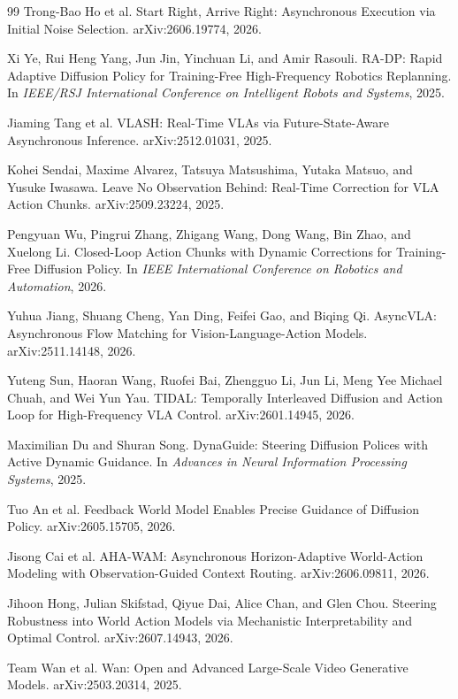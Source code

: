 \documentclass[10pt,twocolumn,letterpaper]{article}
\begin{document}
\begin{thebibliography}{99}
Trong-Bao Ho et al.
\newblock Start Right, Arrive Right: Asynchronous Execution via Initial Noise
Selection.
\newblock arXiv:2606.19774, 2026.

Xi Ye, Rui Heng Yang, Jun Jin, Yinchuan Li, and Amir Rasouli.
\newblock RA-DP: Rapid Adaptive Diffusion Policy for Training-Free High-Frequency
Robotics Replanning.
\newblock In \emph{IEEE/RSJ International Conference on Intelligent Robots and
Systems}, 2025.

Jiaming Tang et al.
\newblock VLASH: Real-Time VLAs via Future-State-Aware Asynchronous Inference.
\newblock arXiv:2512.01031, 2025.

Kohei Sendai, Maxime Alvarez, Tatsuya Matsushima, Yutaka Matsuo, and Yusuke
Iwasawa.
\newblock Leave No Observation Behind: Real-Time Correction for VLA Action
Chunks.
\newblock arXiv:2509.23224, 2025.

Pengyuan Wu, Pingrui Zhang, Zhigang Wang, Dong Wang, Bin Zhao, and Xuelong Li.
\newblock Closed-Loop Action Chunks with Dynamic Corrections for Training-Free
Diffusion Policy.
\newblock In \emph{IEEE International Conference on Robotics and Automation},
2026.

Yuhua Jiang, Shuang Cheng, Yan Ding, Feifei Gao, and Biqing Qi.
\newblock AsyncVLA: Asynchronous Flow Matching for Vision-Language-Action Models.
\newblock arXiv:2511.14148, 2026.

Yuteng Sun, Haoran Wang, Ruofei Bai, Zhengguo Li, Jun Li, Meng Yee Michael Chuah,
and Wei Yun Yau.
\newblock TIDAL: Temporally Interleaved Diffusion and Action Loop for
High-Frequency VLA Control.
\newblock arXiv:2601.14945, 2026.

Maximilian Du and Shuran Song.
\newblock DynaGuide: Steering Diffusion Polices with Active Dynamic Guidance.
\newblock In \emph{Advances in Neural Information Processing Systems}, 2025.

Tuo An et al.
\newblock Feedback World Model Enables Precise Guidance of Diffusion Policy.
\newblock arXiv:2605.15705, 2026.

Jisong Cai et al.
\newblock AHA-WAM: Asynchronous Horizon-Adaptive World-Action Modeling with
Observation-Guided Context Routing.
\newblock arXiv:2606.09811, 2026.

Jihoon Hong, Julian Skifstad, Qiyue Dai, Alice Chan, and Glen Chou.
\newblock Steering Robustness into World Action Models via Mechanistic
Interpretability and Optimal Control.
\newblock arXiv:2607.14943, 2026.

Team Wan et al.
\newblock Wan: Open and Advanced Large-Scale Video Generative Models.
\newblock arXiv:2503.20314, 2025.

\end{thebibliography}

\clearpage
\onecolumn
\raggedbottom
\appendix

\clearpage

\clearpage

\clearpage

\clearpage

\clearpage

\end{document}
